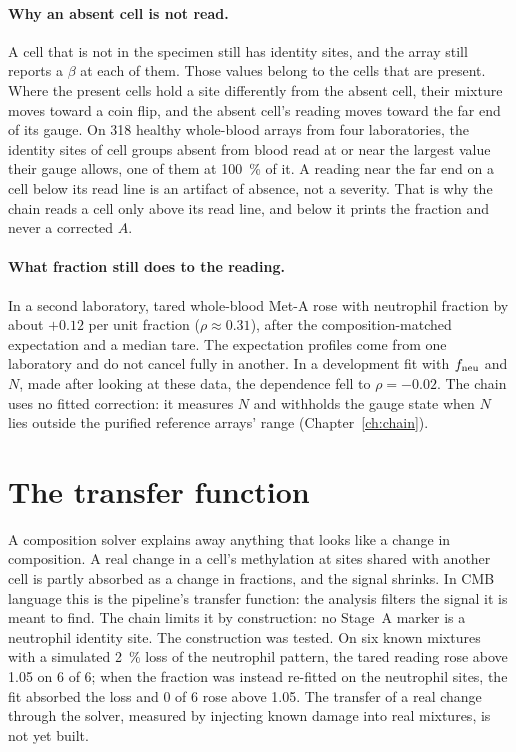 \paragraph{Why an absent cell is not read.} A cell that is not in the specimen still has identity sites, and the array still reports
a $\beta$ at each of them. Those values belong to the cells that are present. Where the present cells hold a site differently from
the absent cell, their mixture moves toward a coin flip, and the absent cell's reading moves toward the far end of its gauge.
\derived{} On 318 healthy whole-blood arrays from four laboratories, the identity sites of cell groups absent from blood read at or
near the largest value their gauge allows, one of them at 100~\% of it. \measured{} A reading near the far end on a cell below its read line is an artifact of absence, not a severity. That
is why the chain reads a cell only above its read line, and below it prints the fraction and never a corrected $A$.

\paragraph{What fraction still does to the reading.} In a second laboratory, tared whole-blood Met-A rose with neutrophil fraction by about $+0.12$
per unit fraction ($\rho\approx0.31$), after the composition-matched expectation and a median tare. \measured{} The expectation
profiles come from one laboratory and do not cancel fully in another. In a development fit with $f_{\rm neu}$ and $N$, made after looking at these data, the dependence fell to
$\rho=-0.02$. \fitted{} The chain uses no fitted correction: it measures $N$ and withholds the gauge state when $N$
lies outside the purified reference arrays' range (Chapter~\ref{ch:chain}).

\section{The transfer function}

A composition solver explains away anything that looks like a change in composition. A real change in a cell's methylation at sites shared with
another cell is partly absorbed as a change in fractions, and the signal shrinks. In CMB language this is the pipeline's transfer function: the
analysis filters the signal it is meant to find. The chain limits it by construction: no Stage~A marker is a neutrophil identity site. The
construction was tested. On six known mixtures with a simulated 2~\% loss of the neutrophil pattern, the tared reading rose above 1.05 on 6 of 6;
when the fraction was instead re-fitted on the neutrophil sites, the fit absorbed the loss and 0 of 6 rose above 1.05. \measured{} The transfer of a real change through the solver, measured by injecting known damage into
real mixtures, is not yet built. \openprob


